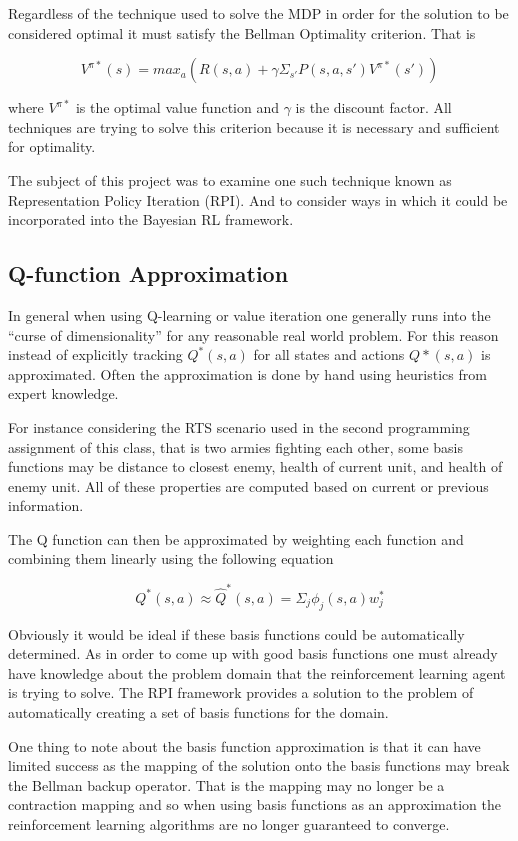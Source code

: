 \documentclass[12pt, letterpaper, final]{report}
\begin{document}
Regardless of the technique used to solve the MDP in order for the
solution to be considered optimal it must satisfy the Bellman Optimality
criterion. That is

\[
V^{\pi*} (s) = max_a ( R(s, a) + \gamma \Sigma_{s'} P(s, a, s')
V^{\pi*}(s'))
\]

where $V^{\pi*}$ is the optimal value function and $\gamma$ is the
discount factor. All techniques are trying to solve this criterion
because it is necessary and sufficient for optimality.

The subject
of this project was to examine one such technique known as
Representation Policy Iteration (RPI). And to consider ways in which
it could be incorporated into the Bayesian RL framework.

\subsection*{Q-function Approximation}

In general when using Q-learning or value iteration one generally runs
into the ``curse of dimensionality'' for any reasonable real world
problem. For this reason instead of explicitly tracking $Q^*(s,a)$ for all
states and actions $Q*(s,a)$ is approximated. Often the approximation
is done by hand using heuristics from expert knowledge.

For instance considering the RTS scenario used in the second
programming assignment of this class, that is two armies fighting each
other, some basis functions may be distance to closest enemy, health
of current unit, and health of enemy unit. All of these properties are
computed based on current or previous information.

The Q function can then be approximated by weighting each function and
combining them linearly using the following equation

\[
Q^*(s,a) \approx \hat{Q}^*(s,a) = \Sigma_j \phi_j(s,a)w_j^*
\]

Obviously it would be ideal if these basis functions could be
automatically determined. As in order to come up with good basis
functions one must already have knowledge about the problem domain
that the reinforcement learning agent is trying to solve. The RPI
framework provides a solution to the problem of automatically creating
a set of basis functions for the domain.

One thing to note about the basis function approximation is that it
 can have limited success as the mapping of
the solution onto the basis functions may break the Bellman backup
operator. That is the mapping may no longer be a contraction mapping
and so when using basis functions as an approximation the
reinforcement learning algorithms are no longer guaranteed to converge.
\end{document}
